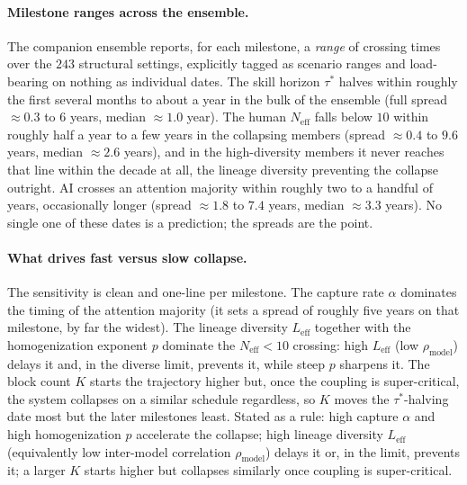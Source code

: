\documentclass[11pt]{article}
\begin{document}
\paragraph{Milestone ranges across the ensemble.} The companion ensemble reports, for each milestone, a \emph{range} of crossing times over the $243$ structural settings, explicitly tagged as scenario ranges and load-bearing on nothing as individual dates. The skill horizon $\tau^\ast$ halves within roughly the first several months to about a year in the bulk of the ensemble (full spread $\approx 0.3$ to $6$ years, median $\approx 1.0$ year). The human $N_{\mathrm{eff}}$ falls below $10$ within roughly half a year to a few years in the collapsing members (spread $\approx 0.4$ to $9.6$ years, median $\approx 2.6$ years), and in the high-diversity members it never reaches that line within the decade at all, the lineage diversity preventing the collapse outright. AI crosses an attention majority within roughly two to a handful of years, occasionally longer (spread $\approx 1.8$ to $7.4$ years, median $\approx 3.3$ years). No single one of these dates is a prediction; the spreads are the point.

\paragraph{What drives fast versus slow collapse.} The sensitivity is clean and one-line per milestone. The capture rate $\alpha$ dominates the timing of the attention majority (it sets a spread of roughly five years on that milestone, by far the widest). The lineage diversity $L_{\mathrm{eff}}$ together with the homogenization exponent $p$ dominate the $N_{\mathrm{eff}}<10$ crossing: high $L_{\mathrm{eff}}$ (low $\rho_{\mathrm{model}}$) delays it and, in the diverse limit, prevents it, while steep $p$ sharpens it. The block count $K$ starts the trajectory higher but, once the coupling is super-critical, the system collapses on a similar schedule regardless, so $K$ moves the $\tau^\ast$-halving date most but the later milestones least. Stated as a rule: high capture $\alpha$ and high homogenization $p$ accelerate the collapse; high lineage diversity $L_{\mathrm{eff}}$ (equivalently low inter-model correlation $\rho_{\mathrm{model}}$) delays it or, in the limit, prevents it; a larger $K$ starts higher but collapses similarly once coupling is super-critical.
\end{document}

